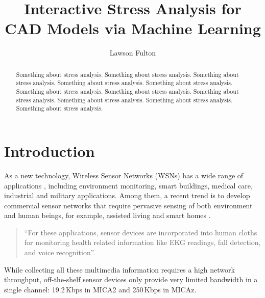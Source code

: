 \documentclass[acmtog, authorversion]{acmart}
\begin{document}
\title{Interactive Stress Analysis for CAD Models
	via Machine Learning} 

\author{Lawson Fulton}


\renewcommand\shortauthors{Fulton}

\begin{abstract}
Something about stress analysis. Something about stress analysis. Something about stress analysis. Something about stress analysis. Something about stress analysis. Something about stress analysis. Something about stress analysis. Something about stress analysis. Something about stress analysis. Something about stress analysis. Something about stress analysis. 
\end{abstract}


%
%





\maketitle

\section{Introduction}

As a new technology, Wireless Sensor Networks (WSNs) has a wide
range of applications \cite{Schulz-17}, including
environment monitoring, smart buildings, medical care, industrial and
military applications. Among them, a recent trend is to develop
commercial sensor networks that require pervasive sensing of both
environment and human beings, for example, assisted living
\cite{Chen-16} and smart homes
\cite{Harvard-01, Adya-01,CROSSBOW}.
\begin{quote}
	``For these applications, sensor devices are incorporated into human
	cloths \cite{Natarajan-01, Zhou-06, Bahl-02, Adya-01} for monitoring
	health related information like EKG readings, fall detection, and
	voice recognition''.
\end{quote}
While collecting all these multimedia information
\cite{Akyildiz-02} requires a high network throughput, off-the-shelf
sensor devices only provide very limited bandwidth in a single
channel: 19.2\,Kbps in MICA2 \cite{Bahl-02} and 250\,Kbps in MICAz.
\end{document}
